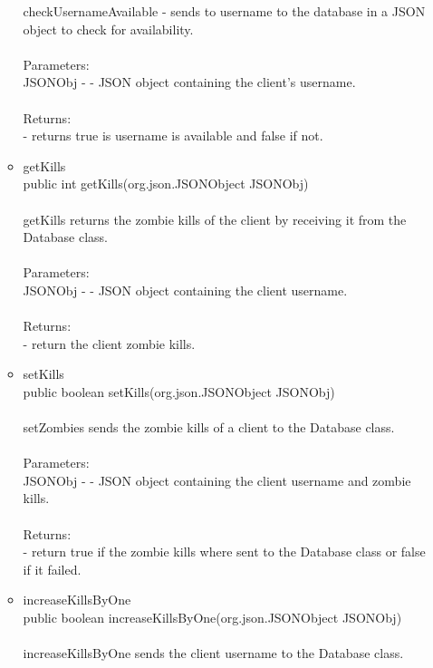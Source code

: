 \documentclass[letterpaper]{article}
\begin{document}
\begin{itemize}
\begin{itemize}
															checkUsernameAvailable - sends to username to the database in a JSON object to check for availability. \\ \\
															Parameters: \\
															JSONObj - - JSON object containing the client's username. \\ \\
															Returns: \\
															- returns true is username is available and false if not.
													\item	getKills \\
															public int getKills(org.json.JSONObject JSONObj) \\ \\
															getKills returns the zombie kills of the client by receiving it from the Database class. \\ \\
															Parameters: \\
															JSONObj - - JSON object containing the client username. \\ \\
															Returns: \\
															- return the client zombie kills.
													\item	setKills \\
															public boolean setKills(org.json.JSONObject JSONObj) \\ \\
															setZombies sends the zombie kills of a client to the Database class. \\ \\
															Parameters: \\
															JSONObj - - JSON object containing the client username and zombie kills. \\ \\
															Returns: \\
															- return true if the zombie kills where sent to the Database class or false if it failed.
													\item	increaseKillsByOne \\
															public boolean increaseKillsByOne(org.json.JSONObject JSONObj) \\ \\
															increaseKillsByOne sends the client username to the Database class. \\ \\

\end{itemize}
\end{itemize}
\end{document}
